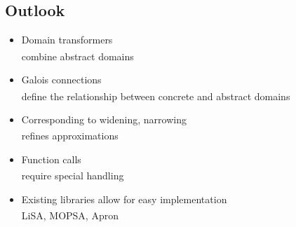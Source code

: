 
\color{black}


\subsection{Outlook}
\begin{frame}{\insertsection}
   \begin{itemize}[<+(1)->]
      \itemsep8pt
      \item Domain transformers\\
         \color{gray}combine abstract domains\textsuperscript{\cite[149]{DBLP:journals/ftpl/Mine17}}
      \item Galois connections\\
         \color{gray}define the relationship between concrete and abstract domains\textsuperscript{\cite[110]{cousout2021principles}}
      \item Corresponding to widening, narrowing\\
      \color{gray}refines approximations\textsuperscript{\cite[395]{cousout2021principles}}
      \item Function calls\\
      \color{gray}require special handling\textsuperscript{\cite{DBLP:journals/iandc/MidtgaardJ12}}
      \item Existing libraries allow for easy implementation\\
      \color{gray}LiSA\textsuperscript{\cite{DBLP:conf/pldi/FerraraNAC21}}, MOPSA\textsuperscript{\cite{DBLP:conf/vstte/JournaultMMO19}}, Apron\textsuperscript{\cite{DBLP:conf/cav/JeannetM09}}
   \end{itemize}
\end{frame}







